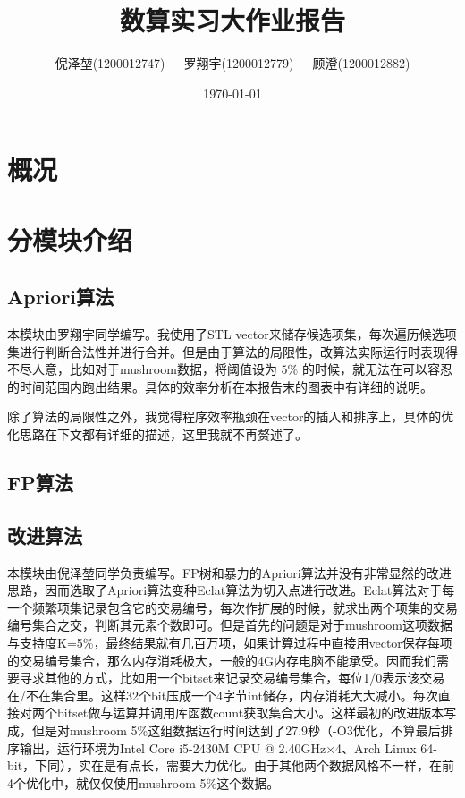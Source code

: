 \documentclass[a4paper,9pt]{article}
\title{\textbf{数算实习大作业报告}}
\author{\small{倪泽堃(1200012747)\ \ \ 罗翔宇(1200012779)\ \ \ 顾澄(1200012882)}}
\date{\today}
\begin{document}
\maketitle
\section{概况}

\section{分模块介绍}

\subsection{Apriori算法}
本模块由罗翔宇同学编写。我使用了STL vector来储存候选项集，每次遍历候选项集进行判断合法性并进行合并。但是由于算法的局限性，改算法实际运行时表现得不尽人意，比如对于mushroom数据，将阈值设为 $5\%$ 的时候，就无法在可以容忍的时间范围内跑出结果。具体的效率分析在本报告末的图表中有详细的说明。

除了算法的局限性之外，我觉得程序效率瓶颈在vector的插入和排序上，具体的优化思路在下文都有详细的描述，这里我就不再赘述了。
\subsection{FP算法}

\subsection{改进算法}
本模块由倪泽堃同学负责编写。FP树和暴力的Apriori算法并没有非常显然的改进思路，因而选取了Apriori算法变种Eclat算法为切入点进行改进。Eclat算法对于每一个频繁项集记录包含它的交易编号，每次作扩展的时候，就求出两个项集的交易编号集合之交，判断其元素个数即可。但是首先的问题是对于mushroom这项数据与支持度K=5\%，最终结果就有几百万项，如果计算过程中直接用vector保存每项的交易编号集合，那么内存消耗极大，一般的4G内存电脑不能承受。因而我们需要寻求其他的方式，比如用一个bitset来记录交易编号集合，每位1/0表示该交易在/不在集合里。这样32个bit压成一个4字节int储存，内存消耗大大减小。每次直接对两个bitset做与运算并调用库函数count获取集合大小。这样最初的改进版本写成，但是对mushroom 5\%这组数据运行时间达到了27.9秒（-O3优化，不算最后排序输出，运行环境为Intel Core i5-2430M CPU @ 2.40GHz$\times$4、Arch Linux 64-bit，下同），实在是有点长，需要大力优化。由于其他两个数据风格不一样，在前4个优化中，就仅仅使用mushroom 5\%这个数据。
\end{document}
